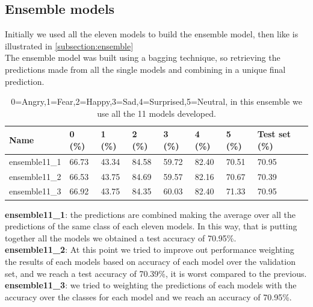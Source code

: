 \documentclass[10pt,twocolumn,letterpaper]{article}
\begin{document}
\subsection{Ensemble models}
Initially we used all the eleven models to build the ensemble model, then like is illustrated in \ref{subsection:ensemble}\\
The ensemble model was built using a bagging technique, so retrieving the predictions made from all the single models and combining in a unique final prediction. 
\def\arraystretch{1.2}
\begin{table}[H]
   \scriptsize
   \begin{tabular}{L{1.1cm}C{0.5cm}C{0.5cm}C{0.5cm}C{0.5cm}C{0.5cm}C{0.5cm}C{0.8cm}}
      \hline
      Name          & 0 (\%) & 1 (\%) & 2 (\%) & 3 (\%) & 4 (\%) & 5 (\%) & Test set (\%) \\
      \hline\hline
      ensemble11\_1 & 66.73  & 43.34  & 84.58  & 59.72  & 82.40  & 70.51  & 70.95         \\
      ensemble11\_2 & 66.53  & 43.75  & 84.69  & 59.57  & 82.16  & 70.67  & 70.39         \\
      ensemble11\_3 & 66.92  & 43.75  & 84.35  & 60.03  & 82.40  & 71.33  & 70.95         \\
      \hline
   \end{tabular}
   \caption{ 0=Angry,1=Fear,2=Happy,3=Sad,4=Surprised,5=Neutral, in this ensemble we use all the 11 models developed.}
   \label{table:accuracymodelli}
\end{table}
\noindent
\textbf{ensemble11\_1}: the predictions are combined making the average over all the predictions of the same class of each eleven models. In this way, that is putting together all the models we obtained a test accuracy of 70.95\%.\\
\textbf{ensemble11\_2}: At this point we tried to improve out performance weighting the results of each models based on accuracy of each model over the validation set, and we reach a test accuracy of 70.39\%, it is worst compared to the previous. \\
\textbf{ensemble11\_3}: we tried to weighting the predictions of each models with the accuracy over the classes for each model and we reach an accuracy of 70.95\%.  \\
\end{document}
